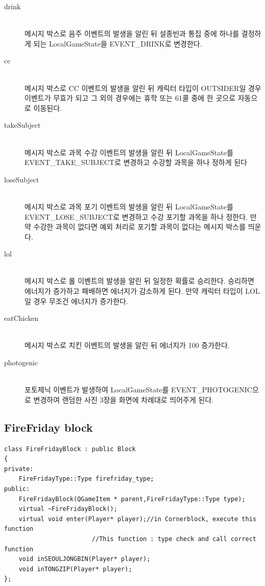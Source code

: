 \documentclass[10pt,oneside,a4paper,titlepage]{article}
\begin{document}
\begin{description}
\item[drink] \hfill \\
메시지 박스로 음주 이벤트의 발생을 알린 뒤 설종빈과 통집 중에 하나를 결정하게 되는 LocalGameState을 EVENT\_DRINK로 변경한다.
\item[cc] \hfill \\
메시지 박스로 CC 이벤트의 발생을 알린 뒤 캐릭터 타입이 OUTSIDER일 경우 이벤트가 무효가 되고 그 외의 경우에는 휴학 또는 61콜 중에 한 곳으로 자동으로 이동된다.
\item[takeSubject] \hfill \\
메시지 박스로 과목 수강 이벤트의 발생을 알린 뒤 LocalGameState를 EVENT\_TAKE\_SUBJECT로 변경하고 수강할 과목을 하나 정하게 된다
\item[loseSubject] \hfill \\
메시지 박스로 과목 포기 이벤트의 발생을 알린 뒤 LocalGameState를 EVENT\_LOSE\_SUBJECT로 변경하고 수강 포기할 과목을 하나 정한다. 만약 수강한 과목이 없다면 예외 처리로 포기할 과목이 없다는 메시지 박스를 띄운다.
\item[lol] \hfill \\
메시지 박스로 롤 이벤트의 발생을 알린 뒤 일정한 확률로 승리한다. 승리하면 에너지가 증가하고 패배하면 에너지가 감소하게 된다. 만약 캐릭터 타입이 LOL일 경우 무조건 에너지가 증가한다.
\item[eatChicken] \hfill \\
메시지 박스로 치킨 이벤트의 발생을 알린 뒤 에너지가 100 증가한다.
\item[photogenic] \hfill \\
포토제닉 이벤트가 발생하여 LocalGameState를 EVENT\_PHOTOGENIC으로 변경하여 랜덤한 사진 3장을 화면에 차례대로 띄어주게 된다.
\end{description}


\subsection{FireFriday block}
\begin{lstlisting}
class FireFridayBlock : public Block
{
private:
    FireFridayType::Type firefriday_type;
public:
    FireFridayBlock(QGameItem * parent,FireFridayType::Type type);
    virtual ~FireFridayBlock();
    virtual void enter(Player* player);//in Cornerblock, execute this function
                        //This function : type check and call correct function
    void inSEOULJONGBIN(Player* player);
    void inTONGZIP(Player* player);
};
\end{lstlisting}
\end{document}
